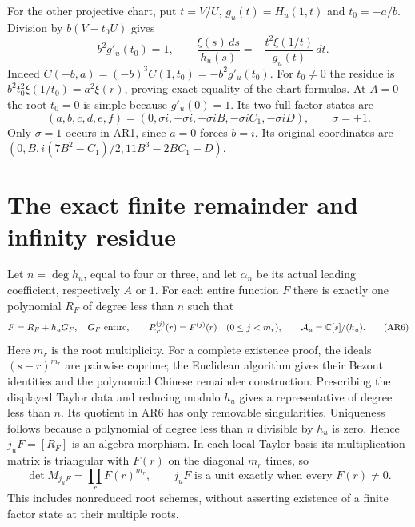 \documentclass[11pt]{article}
\newcommand{\C}{\mathbb C}
\begin{document}
For the other projective chart, put $t=V/U$, $g_u(t)=H_u(1,t)$
and $t_0=-a/b$. Division by $b(V-t_0U)$ gives
\begin{equation}
-b^2g'_u(t_0)=1,\qquad
\frac{\xi(s)\,ds}{h_u(s)}
=-\frac{t^2\xi(1/t)}{g_u(t)}\,dt.
\tag{AR4}
\end{equation}
Indeed $C(-b,a)=(-b)^3C(1,t_0)=-b^2g'_u(t_0)$.
For $t_0\ne0$ the residue is
$b^2t_0^2\xi(1/t_0)=a^2\xi(r)$, proving exact equality
of the chart formulas. At $A=0$ the root $t_0=0$ is simple
because $g'_u(0)=1$. Its two full factor states are
\begin{equation}
(a,b,c,d,e,f)=
(0,\sigma i,-\sigma i,-\sigma iB,-\sigma iC_1,-\sigma iD),
\qquad \sigma=\pm1.
\tag{AR5}
\end{equation}
Only $\sigma=1$ occurs in AR1, since $a=0$ forces $b=i$.
Its original coordinates are
$(0,B,i(7B^2-C_1)/2,11B^3-2BC_1-D)$.

\section{The exact finite remainder and infinity residue}
Let $n=\deg h_u$, equal to four or three, and let $\alpha_n$
be its actual leading coefficient, respectively $A$ or $1$.
For each entire function $F$ there is exactly one polynomial
$R_F$ of degree less than $n$ such that
\begin{equation}
F=R_F+h_uG_F,\quad G_F\text{ entire},\qquad
R_F^{(j)}(r)=F^{(j)}(r)\quad(0\le j<m_r),\qquad
{\cal A}_u=\C[s]/(h_u).
\tag{AR6}
\end{equation}
Here $m_r$ is the root multiplicity. For a complete existence
proof, the ideals $(s-r)^{m_r}$ are pairwise coprime; the
Euclidean algorithm gives their Bezout identities and the
polynomial Chinese remainder construction. Prescribing the
displayed Taylor data and reducing modulo $h_u$ gives a
representative of degree less than $n$. Its quotient in AR6
has only removable singularities. Uniqueness follows because
a polynomial of degree less than $n$ divisible by $h_u$ is
zero. Hence $j_uF=[R_F]$ is an algebra morphism.
In each local Taylor basis its multiplication matrix is
triangular with $F(r)$ on the diagonal $m_r$ times, so
\begin{equation}
\det M_{j_uF}=\prod_rF(r)^{m_r},\qquad
j_uF\text{ is a unit exactly when every }F(r)\ne0.
\tag{AR7}
\end{equation}
This includes nonreduced root schemes, without asserting
existence of a finite factor state at their multiple roots.
\end{document}
